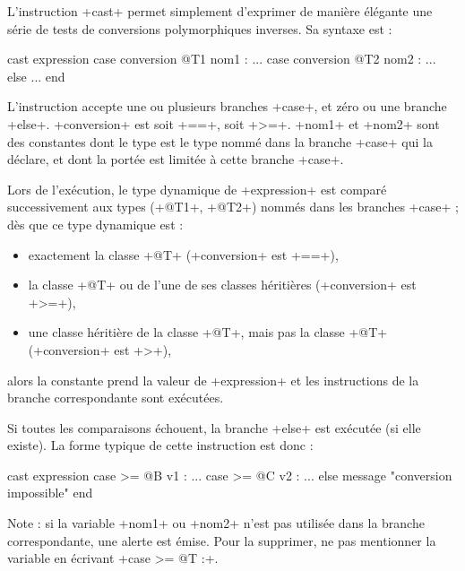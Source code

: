 
L'instruction \ggs+cast+ permet simplement d'exprimer de manière élégante une série de tests de conversions polymorphiques inverses. Sa syntaxe est :

\begin{galgas}
cast expression
case conversion @T1 nom1 :
  ...
case conversion @T2 nom2 :
  ...
else
  ...
end
\end{galgas}

L'instruction accepte une ou plusieurs branches \ggs+case+, et zéro ou une branche \ggs+else+. \ggs+conversion+ est soit \ggs+==+, soit \ggs+>=+. \ggs+nom1+ et \ggs+nom2+ sont des constantes dont le type est le type nommé dans la branche \ggs+case+ qui la déclare, et dont la portée est limitée à cette branche \ggs+case+.

Lors de l'exécution, le type dynamique de \ggs+expression+ est comparé successivement aux types (\ggs+@T1+, \ggs+@T2+) nommés dans les branches \ggs+case+ ; dès que ce type dynamique est :
\begin{itemize}
  \item exactement la classe \ggs+@T+ (\ggs+conversion+ est \ggs+==+), 
  \item la classe \ggs+@T+ ou de l'une de ses classes héritières (\ggs+conversion+ est \ggs+>=+),
  \item une classe héritière de la classe \ggs+@T+, mais pas la classe \ggs+@T+ (\ggs+conversion+ est \ggs+>+),
\end{itemize}
alors la constante prend la valeur de \ggs+expression+ et les instructions de la branche correspondante sont exécutées.

Si toutes les comparaisons échouent, la branche \ggs+else+ est exécutée (si elle existe). La forme typique de cette instruction est donc :


\begin{galgas}
cast expression
case >= @B v1 :
  ...
case >= @C v2 :
  ...
else
  message "conversion impossible"
end
\end{galgas}

Note : si la variable \ggs+nom1+ ou  \ggs+nom2+ n'est pas utilisée dans la branche correspondante, une alerte est émise. Pour la supprimer, ne pas mentionner la variable en écrivant \ggs+case >= @T :+.









